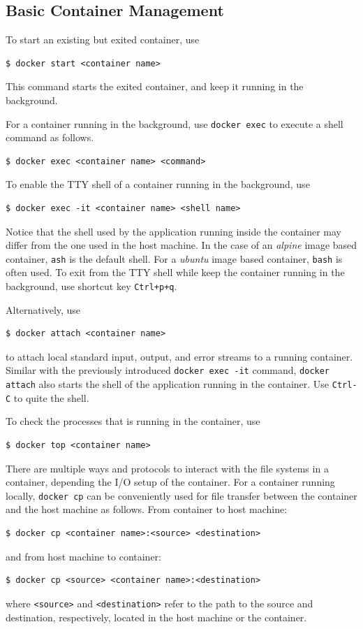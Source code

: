 \subsection{Basic Container Management}

To start an existing but exited container, use
\begin{lstlisting}
$ docker start <container name>
\end{lstlisting}
This command starts the exited container, and keep it running in the background.

For a container running in the background, use \verb|docker exec| to execute a shell command as follows.
\begin{lstlisting}
$ docker exec <container name> <command>
\end{lstlisting}

To enable the TTY shell of a container running in the background, use
\begin{lstlisting}
$ docker exec -it <container name> <shell name>
\end{lstlisting}

Notice that the shell used by the application running inside the container may differ from the one used in the host machine. In the case of an \textit{alpine} image based container, \verb|ash| is the default shell. For a \textit{ubuntu} image based container, \verb|bash| is often used. To exit from the TTY shell while keep the container running in the background, use shortcut key \verb|Ctrl+p+q|. 

Alternatively, use
\begin{lstlisting}
$ docker attach <container name>
\end{lstlisting}
to attach local standard input, output, and error streams to a running container. Similar with the previously introduced \texttt{docker exec -it} command, \texttt{docker attach} also starts the shell of the application running in the container. Use \verb|Ctrl-C| to quite the shell.

To check the processes that is running in the container, use
\begin{lstlisting}
$ docker top <container name>
\end{lstlisting}

There are multiple ways and protocols to interact with the file systems in a container, depending the I/O setup of the container. For a container running locally, \verb|docker cp| can be conveniently used for file transfer between the container and the host machine as follows. From container to host machine:
\begin{lstlisting}
$ docker cp <container name>:<source> <destination>
\end{lstlisting}
and from host machine to container:
\begin{lstlisting}
$ docker cp <source> <container name>:<destination>
\end{lstlisting}
where \verb|<source>| and \verb|<destination>| refer to the path to the source and destination, respectively, located in the host machine or the container.

